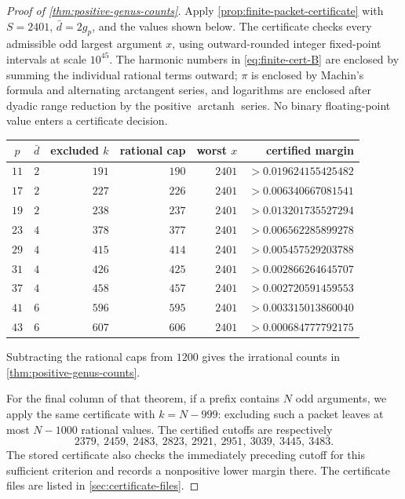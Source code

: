 \documentclass[11pt]{article}
\theoremstyle{definition}
\theoremstyle{remark}
\begin{document}
\begin{proof}[Proof of \cref{thm:positive-genus-counts}]
Apply \cref{prop:finite-packet-certificate} with $S=2401$, $\bar d=2g_p$, and the values
shown below.  The certificate checks every admissible odd largest argument
$x$, using outward-rounded integer fixed-point intervals at scale $10^{45}$.
The harmonic numbers in \eqref{eq:finite-cert-B} are enclosed by summing the
individual rational terms outward; $\pi$ is enclosed by Machin's formula and
alternating arctangent series, and logarithms are enclosed after dyadic range
reduction by the positive $\operatorname{arctanh}$ series.  No binary
floating-point value enters a certificate decision.

\begin{center}
\begin{tabular}{@{}crrrrr@{}}
\toprule
$p$&$\bar d$&excluded $k$&rational cap&worst $x$&certified margin\\
\midrule
$11$&$2$&$191$&$190$&$2401$&$>0.019624155425482$\\
$17$&$2$&$227$&$226$&$2401$&$>0.006340667081541$\\
$19$&$2$&$238$&$237$&$2401$&$>0.013201735527294$\\
$23$&$4$&$378$&$377$&$2401$&$>0.006562285899278$\\
$29$&$4$&$415$&$414$&$2401$&$>0.005457529203788$\\
$31$&$4$&$426$&$425$&$2401$&$>0.002866264645707$\\
$37$&$4$&$458$&$457$&$2401$&$>0.002720591459553$\\
$41$&$6$&$596$&$595$&$2401$&$>0.003315013860040$\\
$43$&$6$&$607$&$606$&$2401$&$>0.000684777792175$\\
\bottomrule
\end{tabular}
\end{center}
Subtracting the rational caps from $1200$ gives the irrational counts in
\cref{thm:positive-genus-counts}.

For the final column of that theorem, if a prefix contains $N$ odd arguments,
we apply the same certificate with $k=N-999$: excluding such a packet leaves
at most $N-1000$ rational values.  The certified cutoffs are respectively
\[
 2379,\ 2459,\ 2483,\ 2823,\ 2921,\ 2951,\ 3039,\ 3445,\ 3483.
\]
The stored certificate also checks the immediately preceding cutoff for this
sufficient criterion and records a nonpositive lower margin there.  The
certificate files are listed in \cref{sec:certificate-files}.
\end{proof}
\end{document}
